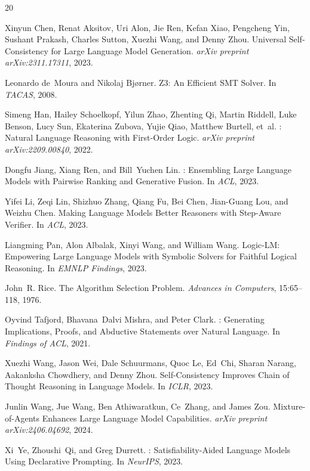\documentclass[11pt,a4paper]{article}
\begin{document}
\begin{thebibliography}{20}

Xinyun Chen, Renat Aksitov, Uri Alon, Jie Ren, Kefan Xiao, Pengcheng Yin, Sushant Prakash, Charles Sutton, Xuezhi Wang, and Denny Zhou.
\newblock Universal Self-Consistency for Large Language Model Generation.
\newblock \emph{arXiv preprint arXiv:2311.17311}, 2023.

Leonardo de~Moura and Nikolaj Bj{\o}rner.
\newblock Z3: An Efficient {SMT} Solver.
\newblock In \emph{TACAS}, 2008.

Simeng Han, Hailey Schoelkopf, Yilun Zhao, Zhenting Qi, Martin Riddell, Luke Benson, Lucy Sun, Ekaterina Zubova, Yujie Qiao, Matthew Burtell, et~al.
: Natural Language Reasoning with First-Order Logic.
\newblock \emph{arXiv preprint arXiv:2209.00840}, 2022.

Dongfu Jiang, Xiang Ren, and Bill~Yuchen Lin.
: Ensembling Large Language Models with Pairwise Ranking and Generative Fusion.
\newblock In \emph{ACL}, 2023.

Yifei Li, Zeqi Lin, Shizhuo Zhang, Qiang Fu, Bei Chen, Jian-Guang Lou, and Weizhu Chen.
\newblock Making Language Models Better Reasoners with Step-Aware Verifier.
\newblock In \emph{ACL}, 2023.

Liangming Pan, Alon Albalak, Xinyi Wang, and William Wang.
\newblock Logic-{LM}: Empowering Large Language Models with Symbolic Solvers for Faithful Logical Reasoning.
\newblock In \emph{EMNLP Findings}, 2023.

John~R. Rice.
\newblock The Algorithm Selection Problem.
\newblock \emph{Advances in Computers}, 15:65--118, 1976.

Oyvind Tafjord, Bhavana~Dalvi Mishra, and Peter Clark.
: Generating Implications, Proofs, and Abductive Statements over Natural Language.
\newblock In \emph{Findings of ACL}, 2021.

Xuezhi Wang, Jason Wei, Dale Schuurmans, Quoc Le, Ed~Chi, Sharan Narang, Aakanksha Chowdhery, and Denny Zhou.
\newblock Self-Consistency Improves Chain of Thought Reasoning in Language Models.
\newblock In \emph{ICLR}, 2023.

Junlin Wang, Jue Wang, Ben Athiwaratkun, Ce~Zhang, and James Zou.
\newblock Mixture-of-Agents Enhances Large Language Model Capabilities.
\newblock \emph{arXiv preprint arXiv:2406.04692}, 2024.

Xi~Ye, Zhoushi~Qi, and Greg Durrett.
: Satisfiability-Aided Language Models Using Declarative Prompting.
\newblock In \emph{NeurIPS}, 2023.

\end{thebibliography}
\end{document}
